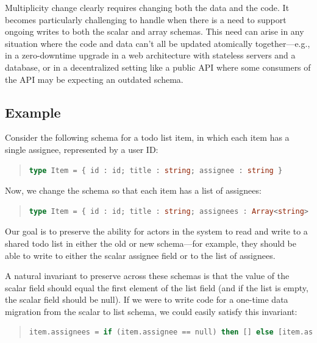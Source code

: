 \documentclass[english,submission]{programming}
\begin{document}
Multiplicity change clearly requires changing both the data and the code. It becomes particularly challenging to handle when there is a need to support ongoing writes to both the scalar and array schemas. This need can arise in any situation where the code and data can't all be updated atomically together—e.g., in a zero-downtime upgrade in a web architecture with stateless servers and a database, or in a decentralized setting like a public API where some consumers of the API may be expecting an outdated schema.

\subsection{Example}

Consider the following schema for a todo list item, in which each item has a single assignee, represented by a user ID:

\begin{quote}
\begin{lstlisting}[language=ml]
type Item = { id : id; title : string; assignee : string }
\end{lstlisting}
\end{quote}

Now, we change the schema so that each item has a list of assignees:

\begin{quote}
\begin{lstlisting}[language=ml]
type Item = { id : id; title : string; assignees : Array<string> }
\end{lstlisting}
\end{quote}

Our goal is to preserve the ability for actors in the system to read and write to a shared todo list in either the old or new schema—for example, they should be able to write to either the scalar assignee field or to the list of assignees.

A natural invariant to preserve across these schemas is that the value of the scalar field should equal the first element of the list field (and if the list is empty, the scalar field should be null). If we were to write code for a one-time data migration from the scalar to list schema, we could easily satisfy this invariant:

\begin{quote}
\begin{lstlisting}[language=ml]
item.assignees = if (item.assignee == null) then [] else [item.assignee]
\end{lstlisting}
\end{quote}
\end{document}
